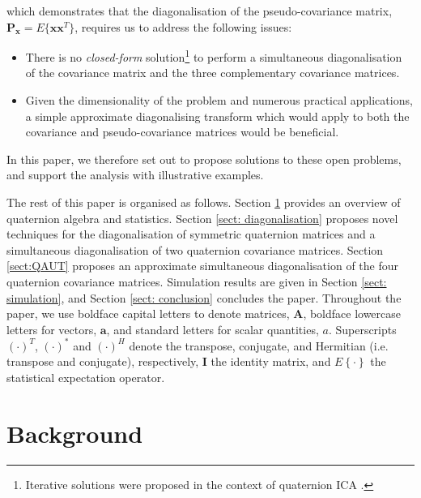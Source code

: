 \documentclass[review]{elsarticle}
\theoremstyle{plain}
\theoremstyle{remark}
\theoremstyle{plain}
\theoremstyle{definition}
\theoremstyle{prop}
\theoremstyle{definition}
\theoremstyle{plain}
\theoremstyle{plain}
\begin{document}
which demonstrates that the diagonalisation of the pseudo-covariance matrix, $\mathbf{P}_\mathbf{x}=E\{\mathbf{\mathbf{xx}}^{T}\}$, requires us to address the following issues: 
\begin{itemize}
\item There is no \emph{closed-form} solution\footnote{Iterative solutions were proposed in the context of quaternion ICA \cite{Via2011}.} to perform a simultaneous diagonalisation of the covariance matrix and the three complementary covariance matrices. 
\item Given the dimensionality of the problem and numerous practical applications, a simple approximate diagonalising transform which would apply to both the covariance and pseudo-covariance matrices would be beneficial. 
\end{itemize}
In this paper, we therefore set out to propose solutions to these open problems, and support the analysis with illustrative examples.

The rest of this paper is organised as follows. Section \ref{sect: background} provides an overview
of quaternion algebra and statistics. Section \ref{sect: diagonalisation} proposes novel techniques for the diagonalisation of symmetric quaternion matrices and a simultaneous diagonalisation of two quaternion covariance matrices. Section \ref{sect:QAUT} proposes an approximate simultaneous diagonalisation of the four quaternion covariance matrices. Simulation results are given in Section \ref{sect: simulation}, and Section \ref{sect: conclusion} concludes the paper. Throughout the paper, we use
boldface capital letters to denote matrices, $\mathbf{A}$, boldface
lowercase letters for vectors, $\mathbf{a}$, and standard letters
for scalar quantities, $a$. Superscripts $(\cdot)^{T}$, $(\cdot)^{*}$
and $(\cdot)^{H}$ denote the transpose, conjugate, and Hermitian
(i.e. transpose and conjugate), respectively, $\mathbf{I}$ the identity matrix,
and $E\left\{ \cdot\right\} $ the statistical expectation operator.
%
\section{Background}\label{sect: background}
\end{document}
